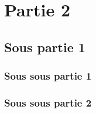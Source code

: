 \chapter{Partie 2}

\section{Sous partie 1}
	\subsection{Sous sous partie 1}
		\lipsum[1-2]

	\subsection{Sous sous partie 2}
		\lipsum[1-2]